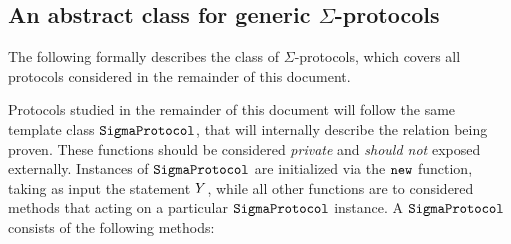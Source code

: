 \documentclass[11pt]{article}
\begin{document}
\subsection{An abstract class for generic $\Sigma$-protocols}
The following formally describes the class of $\Sigma$-protocols, which covers all protocols considered in the remainder of this document.

Protocols studied in the remainder of this document will follow the same template class $\texttt{SigmaProtocol}$, that will internally describe the relation being proven. These functions should be considered \emph{private} and \emph{should not} exposed externally.
Instances of $\texttt{SigmaProtocol}$ are initialized via the $\texttt{new}$ function, taking as input the statement $Y$, while all other functions are to considered methods that acting on a particular $\texttt{SigmaProtocol}$ instance.
A $\texttt{SigmaProtocol}$ consists of the following methods:
\end{document}
